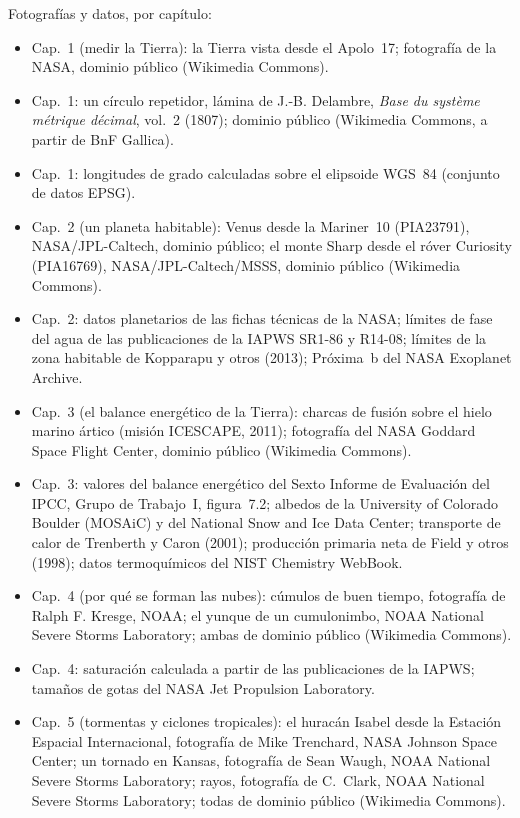 \bigskip
\noindent Fotografías y datos, por capítulo:
\begin{itemize}\small
  \item Cap.~1 (medir la Tierra): la Tierra vista desde el Apolo~17; fotografía de la NASA, dominio público (Wikimedia Commons).
  \item Cap.~1: un círculo repetidor, lámina de J.-B. Delambre, \emph{Base du système métrique décimal}, vol.~2 (1807); dominio público (Wikimedia Commons, a partir de BnF Gallica).
  \item Cap.~1: longitudes de grado calculadas sobre el elipsoide WGS~84 (conjunto de datos EPSG).
  \item Cap.~2 (un planeta habitable): Venus desde la Mariner~10 (PIA23791), NASA/JPL-Caltech, dominio público; el monte Sharp desde el róver Curiosity (PIA16769), NASA/JPL-Caltech/MSSS, dominio público (Wikimedia Commons).
  \item Cap.~2: datos planetarios de las fichas técnicas de la NASA; límites de fase del agua de las publicaciones de la IAPWS SR1-86 y R14-08; límites de la zona habitable de Kopparapu y otros (2013); Próxima~b del NASA Exoplanet Archive.
  \item Cap.~3 (el balance energético de la Tierra): charcas de fusión sobre el hielo marino ártico (misión ICESCAPE, 2011); fotografía del NASA Goddard Space Flight Center, dominio público (Wikimedia Commons).
  \item Cap.~3: valores del balance energético del Sexto Informe de Evaluación del IPCC, Grupo de Trabajo~I, figura~7.2; albedos de la University of Colorado Boulder (MOSAiC) y del National Snow and Ice Data Center; transporte de calor de Trenberth y Caron (2001); producción primaria neta de Field y otros (1998); datos termoquímicos del NIST Chemistry WebBook.
  \item Cap.~4 (por qué se forman las nubes): cúmulos de buen tiempo, fotografía de Ralph F. Kresge, NOAA; el yunque de un cumulonimbo, NOAA National Severe Storms Laboratory; ambas de dominio público (Wikimedia Commons).
  \item Cap.~4: saturación calculada a partir de las publicaciones de la IAPWS; tamaños de gotas del NASA Jet Propulsion Laboratory.
  \item Cap.~5 (tormentas y ciclones tropicales): el huracán Isabel desde la Estación Espacial Internacional, fotografía de Mike Trenchard, NASA Johnson Space Center; un tornado en Kansas, fotografía de Sean Waugh, NOAA National Severe Storms Laboratory; rayos, fotografía de C.~Clark, NOAA National Severe Storms Laboratory; todas de dominio público (Wikimedia Commons).

\end{itemize}
